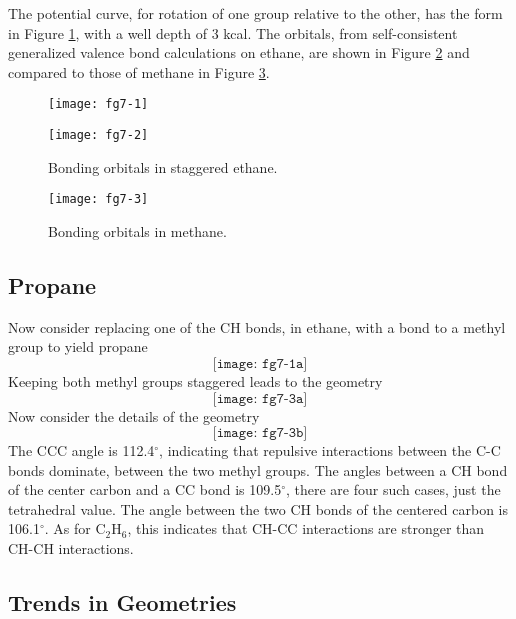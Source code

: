 The potential curve, for rotation of one group relative to the other,
has the form in Figure \ref{chap7-fig1}, with a well depth of 3 kcal.
The orbitals, from self-consistent generalized valence bond
calculations \cite{chap7-ref1} on ethane, are shown in Figure
\ref{chap7-fig2} and compared to those of methane in Figure
\ref{chap7-fig3}.


\begin{figure}
\texttt{[image: fg7-1]}
\caption{}
\label{chap7-fig1}
\end{figure}

\begin{figure}
\texttt{[image: fg7-2]}
\caption{Bonding orbitals in staggered ethane.}
\label{chap7-fig2}
\end{figure}

\begin{figure}
\texttt{[image: fg7-3]}
\caption{Bonding orbitals in methane.}
\label{chap7-fig3}
\end{figure}


\subsection{Propane}

Now consider replacing one of the CH bonds, in ethane, with a bond 
to a methyl group to yield propane
\begin{equation}
\texttt{[image: fg7-1a]}
\label{chap7-eqno4}
\end{equation}
Keeping both methyl groups staggered leads to the geometry
\begin{equation}
\texttt{[image: fg7-3a]}
\label{chap7-eqno5}
\end{equation}
Now consider the details of the geometry
\begin{equation}
\texttt{[image: fg7-3b]}
\label{chap7-eqno6}
\end{equation}
The CCC angle is 112.4$^{\circ}$, indicating that repulsive interactions 
between the C-C bonds dominate, between the two methyl groups. The 
angles between a CH bond of the center carbon and a CC bond is 
109.5$^{\circ}$, there are four such cases, just the tetrahedral value. The 
angle between the two CH bonds of the centered carbon is 
106.1$^{\circ}$.  As for C$_2$H$_6$, this indicates that CH-CC 
interactions are stronger than CH-CH interactions.

\subsection{Trends in Geometries}

